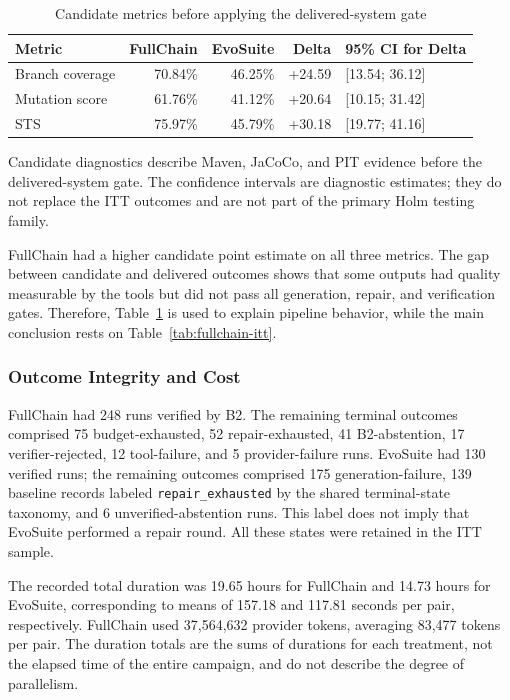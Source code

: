 \documentclass[pdflatex,sn-basic,Numbered,iicol]{sn-jnl}
\begin{document}
\begin{table}[htbp]
\caption{Candidate metrics before applying the delivered-system gate}\label{tab:fullchain-candidate}
\centering
\scriptsize
\begin{tabularx}{\textwidth}{@{}>{\raggedright\arraybackslash}X r r r l@{}}
\toprule
Metric & FullChain & EvoSuite & Delta & 95\% CI for Delta \\
\midrule
Branch coverage & 70.84\% & 46.25\% & +24.59 & [13.54; 36.12] \\
Mutation score & 61.76\% & 41.12\% & +20.64 & [10.15; 31.42] \\
STS & 75.97\% & 45.79\% & +30.18 & [19.77; 41.16] \\
\bottomrule
\end{tabularx}
\begin{tablenotes}
\item Candidate diagnostics describe Maven, JaCoCo, and PIT evidence before the delivered-system gate. The confidence intervals are diagnostic estimates; they do not replace the ITT outcomes and are not part of the primary Holm testing family.
\end{tablenotes}
\end{table}

FullChain had a higher candidate point estimate on all three metrics. The gap between candidate and delivered outcomes shows that some outputs had quality measurable by the tools but did not pass all generation, repair, and verification gates. Therefore, Table~\ref{tab:fullchain-candidate} is used to explain pipeline behavior, while the main conclusion rests on Table~\ref{tab:fullchain-itt}.

\subsubsection{Outcome Integrity and Cost}\label{subsubsec:fullchain-integrity}

FullChain had 248 runs verified by B2. The remaining terminal outcomes comprised 75 budget-exhausted, 52 repair-exhausted, 41 B2-abstention, 17 verifier-rejected, 12 tool-failure, and 5 provider-failure runs. EvoSuite had 130 verified runs; the remaining outcomes comprised 175 generation-failure, 139 baseline records labeled \texttt{repair\_exhausted} by the shared terminal-state taxonomy, and 6 unverified-abstention runs. This label does not imply that EvoSuite performed a repair round. All these states were retained in the ITT sample.

The recorded total duration was 19.65 hours for FullChain and 14.73 hours for EvoSuite, corresponding to means of 157.18 and 117.81 seconds per pair, respectively. FullChain used 37,564,632 provider tokens, averaging 83,477 tokens per pair. The duration totals are the sums of durations for each treatment, not the elapsed time of the entire campaign, and do not describe the degree of parallelism.
\end{document}
